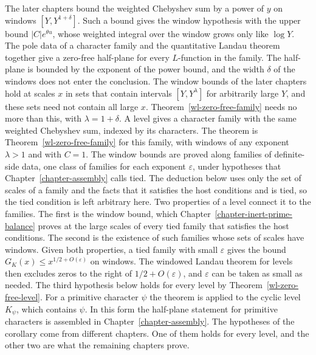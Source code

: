 The later chapters bound the weighted Chebyshev sum by a power of $y$ on windows $[Y,Y^{1+\delta}]$. Such a bound gives the window hypothesis with the upper bound $|C|e^{\theta u}$, whose weighted integral over the window grows only like $\log Y$.
The pole data of a character family and the quantitative Landau theorem together give a zero-free half-plane for every $L$-function in the family. The half-plane is bounded by the exponent of the power bound, and the width $\delta$ of the windows does not enter the conclusion.
The window bounds of the later chapters hold at scales $x$ in sets that contain intervals $[Y,Y^\lambda]$ for arbitrarily large $Y$, and these sets need not contain all large $x$. Theorem~\ref{wl-zero-free-family} needs no more than this, with $\lambda=1+\delta$.
A level gives a character family with the same weighted Chebyshev sum, indexed by its characters. The theorem is Theorem~\ref{wl-zero-free-family} for this family, with windows of any exponent $\lambda>1$ and with $C=1$.
The window bounds are proved along families of definite-side data, one class of families for each exponent $\varepsilon$, under hypotheses that Chapter~\ref{chapter-assembly} calls tied. The deduction below uses only the set of scales of a family and the facts that it satisfies the host conditions and is tied, so the tied condition is left arbitrary here.
Two properties of a level connect it to the families. The first is the window bound, which Chapter~\ref{chapter-inert-prime-balance} proves at the large scales of every tied family that satisfies the host conditions. The second is the existence of such families whose sets of scales have windows.
Given both properties, a tied family with small $\varepsilon$ gives the bound $G_K(x)\leq x^{1/2+O(\varepsilon)}$ on windows. The windowed Landau theorem for levels then excludes zeros to the right of $1/2+O(\varepsilon)$, and $\varepsilon$ can be taken as small as needed. The third hypothesis below holds for every level by Theorem~\ref{wl-zero-free-level}.
For a primitive character $\psi$ the theorem is applied to the cyclic level $K_\psi$, which contains $\psi$. In this form the half-plane statement for primitive characters is assembled in Chapter~\ref{chapter-assembly}.
The hypotheses of the corollary come from different chapters. One of them holds for every level, and the other two are what the remaining chapters prove.
